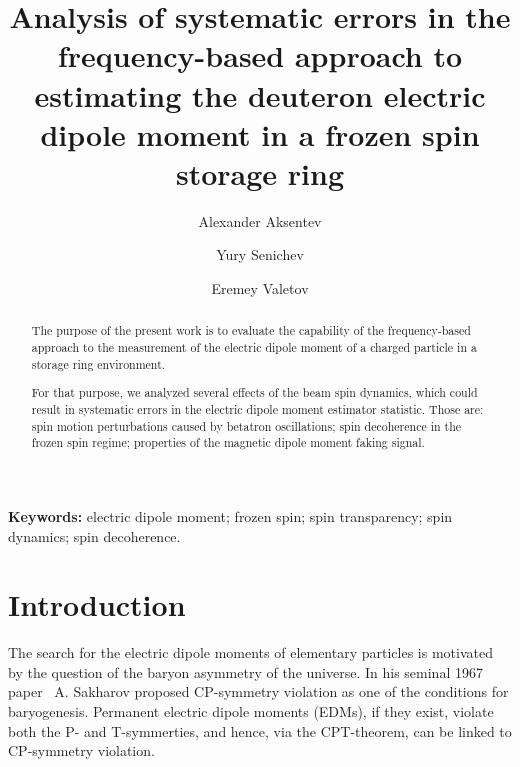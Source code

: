 \documentclass[]{elsarticle}
\begin{document}
\title{Analysis of systematic errors in the frequency-based approach to estimating
  the deuteron electric dipole moment in a frozen spin storage ring}

\author[FZJ,INR,MEPHI]{Alexander Aksentev}

\author[INR]{Yury Senichev}

\author[MSU]{Eremey Valetov}


\address[FZJ]{Institut f\"ur Kernphysik (IKP-2), Forschungszentrum J\"ulich,
  J\"ulich, Germany}
\address[INR]{Institute for Nuclear Research of the Russian Academy of Sciences,
  Moscow, Russia}
\address[MEPHI]{National Research Nuclear University ``MEPhI,''
  Moscow, Russia}
\address[MSU]{Department of Physics and Astronomy, Michigan State University,
  MI 48824, USA}


\begin{abstract}
  The purpose of the present work is to evaluate the capability of the frequency-based approach
  to the measurement of the electric dipole moment of a charged particle in a storage ring environment.

  For that purpose, we analyzed several effects of the beam spin dynamics, which could result in systematic
  errors in the electric dipole moment estimator statistic. Those are: spin motion perturbations caused by
  betatron oscillations; spin decoherence in the frozen spin regime; properties of the magnetic dipole
  moment faking signal.
\end{abstract}


\maketitle

\textbf{Keywords:} electric dipole moment; frozen spin; spin transparency; spin dynamics; spin decoherence.

\tableofcontents

\section{Introduction}
The search for the electric dipole moments of elementary particles is motivated by the question of
the baryon asymmetry of the universe. In his seminal 1967 paper~\cite{Sakharov:Baryogenesis} A. Sakharov
proposed CP-symmetry violation as one of the conditions for baryogenesis.
Permanent electric dipole moments (EDMs), if they exist, violate both the P- and T-symmerties, and hence,
via the CPT-theorem, can be linked to CP-symmetry violation.
\end{document}
